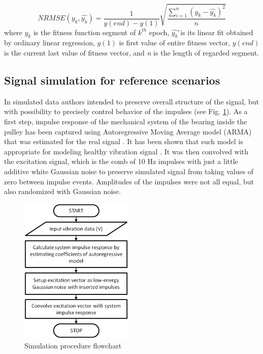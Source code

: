 \documentclass[preprint,12pt]{elsarticle}
\begin{document}
\begin{equation}
\label{eq:spectrogram}
NRMSE(y_k,\hat{y_k})=\frac{1}{y(end) - y(1)}\sqrt{\frac{\sum_{i=1}^{n} \left(y_k - \hat{y_k} \right)^2}{n}}
\end{equation}
where $y_k$  is the fitness function segment of $k^{th}$ epoch, $\hat{y_k}$ ̂is its linear fit obtained by ordinary linear regression, $y(1)$ is first value of entire fitness vector, $y(end)$ is the current last value of fitness vector, and \emph{n} is the length of regarded segment.


\subsection{Signal simulation for reference scenarios} \label{sim}

In simulated data authors intended to preserve overall structure of the signal, but with possibility to precisely control behavior of the impulses (see Fig. \ref{fig:block2}). As a first step, impulse response of the mechanical system of the bearing inside the pulley has been captured using Autoregressive Moving Average model (ARMA) that was estimated for the real signal \cite{brockwell2013time}. It has been shown that such model is appropriate for modeling healthy vibration signal \cite{pham2010estimation}. It was then convolved with the excitation signal, which is the comb of 10 Hz impulses with just a little additive white Gaussian noise to preserve simulated signal from taking values of zero between impulse events. Amplitudes of the impulses were not all equal, but also randomized with Gaussian noise. 

\begin{figure}[ht!]
\centering
\includegraphics[width=0.48\textwidth]{wykresy/block2.png}
\caption{Simulation procedure flowchart}
\label{fig:block2}
\end{figure}
\end{document}
